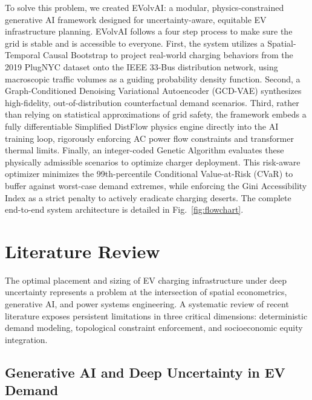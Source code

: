 \documentclass[conference]{IEEEtran}
\begin{document}
To solve this problem, we created EVolvAI: a modular, physics-constrained generative AI framework designed for uncertainty-aware, equitable EV infrastructure planning. EVolvAI follows a four step process to make sure the grid is stable and is accessible to everyone. First, the system utilizes a Spatial-Temporal Causal Bootstrap to project real-world charging behaviors from the 2019 PlugNYC dataset onto the IEEE 33-Bus distribution network, using macroscopic traffic volumes as a guiding probability density function. Second, a Graph-Conditioned Denoising Variational Autoencoder (GCD-VAE) synthesizes high-fidelity, out-of-distribution counterfactual demand scenarios. Third, rather than relying on statistical approximations of grid safety, the framework embeds a fully differentiable Simplified DistFlow physics engine directly into the AI training loop, rigorously enforcing AC power flow constraints and transformer thermal limits. Finally, an integer-coded Genetic Algorithm evaluates these physically admissible scenarios to optimize charger deployment. This risk-aware optimizer minimizes the 99th-percentile Conditional Value-at-Risk (CVaR) to buffer against worst-case demand extremes, while enforcing the Gini Accessibility Index as a strict penalty to actively eradicate charging deserts. The complete end-to-end system architecture is detailed in Fig.~\ref{fig:flowchart}.

\section{Literature Review}

The optimal placement and sizing of EV charging infrastructure under deep uncertainty represents a problem at the intersection of spatial econometrics, generative AI, and power systems engineering. A systematic review of recent literature exposes persistent limitations in three critical dimensions: deterministic demand modeling, topological constraint enforcement, and socioeconomic equity integration.

\subsection{Generative AI and Deep Uncertainty in EV Demand}
\end{document}
